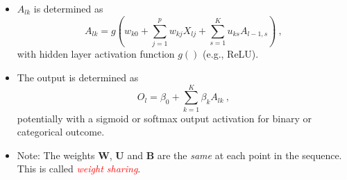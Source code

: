 \documentclass[
  10pt,
  ignorenonframetext,
]{beamer}
\providecommand{\tightlist}{%
  \setlength{\itemsep}{0pt}\setlength{\parskip}{0pt}}
\begin{document}
\begin{frame}
\begin{itemize}
\tightlist
\item
  \(A_{lk}\) is determined as \begin{equation}\label{eq:chain}
  A_{lk} = g(w_{k0} + \sum_{j=1}^p w_{kj}X_{lj} + \sum_{s=1}^K u_{ks}A_{l-1,s}) \ ,
  \end{equation} with hidden layer activation function \(g()\) (e.g.,
  ReLU).
\end{itemize}

\vspace{2mm}

\begin{itemize}
\tightlist
\item
  The output is determined as
  \[O_l = \beta_0 + \sum_{k=1}^K\beta_k A_{lk} \ ,\] potentially with a
  sigmoid or softmax output activation for binary or categorical
  outcome.
\end{itemize}

\vspace{2mm}

\begin{itemize}
\tightlist
\item
  Note: The weights \(\boldsymbol{W}\), \(\boldsymbol{U}\) and
  \(\boldsymbol{B}\) are the \emph{same} at each point in the sequence.
  This is called \emph{\textcolor{red}{weight sharing}}.
\end{itemize}
\end{frame}
\end{document}
